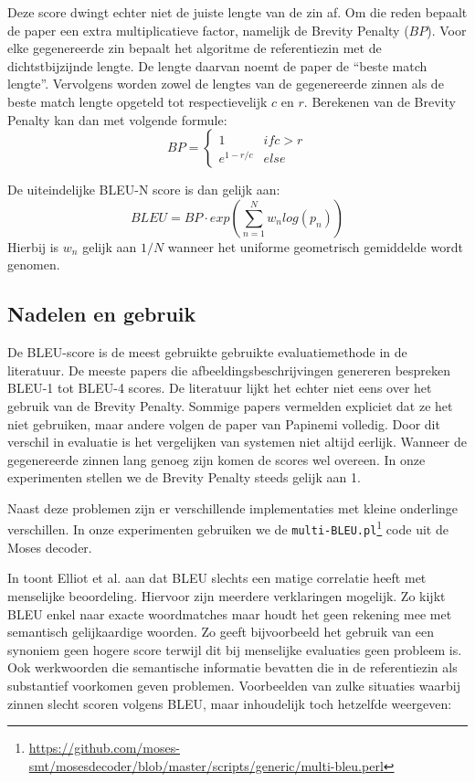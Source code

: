 Deze score dwingt echter niet de juiste lengte van de zin af. Om die reden bepaalt de paper een extra multiplicatieve factor, namelijk de Brevity Penalty ($BP$). Voor elke gegenereerde zin bepaalt het algoritme de referentiezin met de dichtstbijzijnde lengte. De lengte daarvan noemt de paper de ``beste match lengte''. Vervolgens worden zowel de lengtes van de gegenereerde zinnen als de beste match lengte opgeteld tot respectievelijk $c$ en $r$. Berekenen van de Brevity Penalty kan dan met volgende formule:
\begin{equation}BP=
 \begin{cases}
1 & if c > r \\
e^{1-r/c} & else
\end{cases}
\end{equation}

De uiteindelijke BLEU-N score is dan gelijk aan:
\begin{equation}
BLEU = BP\cdot exp(\sum\limits_{n=1}^N w_nlog(p_n))
\end{equation}
Hierbij is $w_n$ gelijk aan $1/N$ wanneer het uniforme geometrisch gemiddelde wordt genomen.

\subsection{Nadelen en gebruik}
De BLEU-score is de meest gebruikte gebruikte evaluatiemethode in de literatuur. De meeste papers die afbeeldingsbeschrijvingen genereren bespreken BLEU-1 tot BLEU-4 scores. De literatuur lijkt het echter niet eens over het gebruik van de Brevity Penalty. Sommige papers vermelden expliciet dat ze het niet gebruiken, maar andere volgen de paper van Papinemi volledig. Door dit verschil in evaluatie is het vergelijken van systemen niet altijd eerlijk. Wanneer de gegenereerde zinnen lang genoeg zijn komen de scores wel overeen.
In onze experimenten stellen we de Brevity Penalty steeds gelijk aan 1.

Naast deze problemen zijn er verschillende implementaties met kleine onderlinge verschillen. In onze experimenten gebruiken we de \texttt{multi-BLEU.pl}\footnote{\url{https://github.com/moses-smt/mosesdecoder/blob/master/scripts/generic/multi-bleu.perl}} code uit de Moses decoder.

In  toont Elliot et al. aan dat BLEU slechts een matige correlatie heeft met menselijke beoordeling.
Hiervoor zijn meerdere verklaringen mogelijk. Zo kijkt BLEU enkel naar exacte woordmatches maar houdt het geen rekening mee met semantisch gelijkaardige woorden. Zo geeft bijvoorbeeld het gebruik van een synoniem geen hogere score terwijl dit bij menselijke evaluaties geen probleem is. Ook werkwoorden die semantische informatie bevatten die in de referentiezin als substantief voorkomen geven problemen. Voorbeelden van zulke situaties waarbij zinnen slecht scoren volgens BLEU, maar inhoudelijk toch hetzelfde weergeven:
\\

